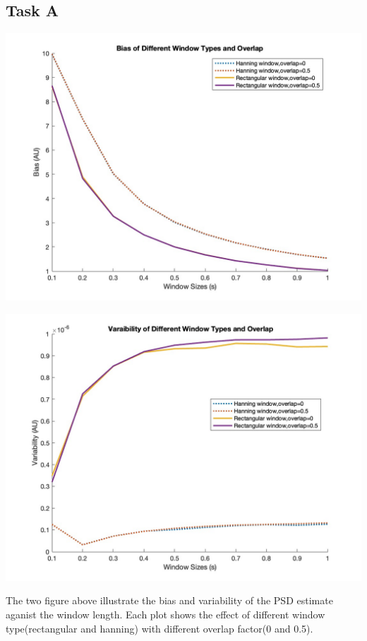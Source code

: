 \documentclass[8pt]{article}  %
\theoremstyle{plain}
\theoremstyle{definition}
\theoremstyle{remark}
\begin{document}
    \subsection{Task A}
    \begin{minipage}{0.5\textwidth}
        \centering
        \includegraphics[width=\linewidth]{figure/figure7.jpg}
    \end{minipage}
    \hfill
    \begin{minipage}{0.5\textwidth}
        \centering
        \includegraphics[width=\linewidth]{figure/figure8.jpg}
    \end{minipage}
    The two figure above illustrate the bias and variability of the PSD estimate 
    aganist the window length. Each plot shows the effect of different window type(rectangular and hanning) 
    with different overlap factor(0 and 0.5).
\end{document}
